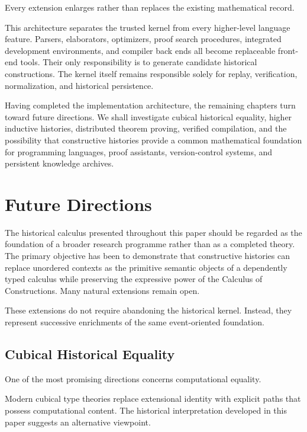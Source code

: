 \documentclass[12pt,oneside]{article}
\theoremstyle{definition}
\theoremstyle{remark}
\begin{document}
Every extension enlarges rather than replaces the existing mathematical record.

This architecture separates the trusted kernel from every higher-level language
feature. Parsers, elaborators, optimizers, proof search procedures, integrated
development environments, and compiler back ends all become replaceable
front-end tools. Their only responsibility is to generate candidate historical
constructions. The kernel itself remains responsible solely for replay,
verification, normalization, and historical persistence.

Having completed the implementation architecture, the remaining chapters turn
toward future directions. We shall investigate cubical historical equality,
higher inductive histories, distributed theorem proving, verified compilation,
and the possibility that constructive histories provide a common mathematical
foundation for programming languages, proof assistants, version-control systems,
and persistent knowledge archives.

\section{Future Directions}

The historical calculus presented throughout this paper should be regarded as
the foundation of a broader research programme rather than as a completed
theory. The primary objective has been to demonstrate that constructive
histories can replace unordered contexts as the primitive semantic objects of a
dependently typed calculus while preserving the expressive power of the
Calculus of Constructions. Many natural extensions remain open.

These extensions do not require abandoning the historical kernel. Instead, they
represent successive enrichments of the same event-oriented foundation.

\subsection{Cubical Historical Equality}

One of the most promising directions concerns computational equality.

Modern cubical type theories replace extensional identity with explicit paths
that possess computational content. The historical interpretation developed in
this paper suggests an alternative viewpoint.
\end{document}
